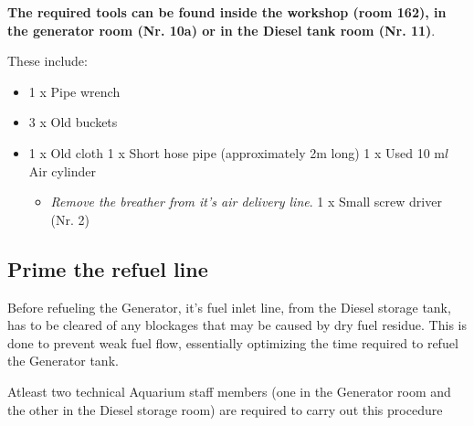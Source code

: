 \documentclass[
  12pt,
]{report}
\providecommand{\tightlist}{%
  \setlength{\itemsep}{0pt}\setlength{\parskip}{0pt}}\usepackage{longtable,booktabs,array}
\begin{document}
\textbf{The required tools can be found inside the workshop (room 162),
in the generator room (Nr. 10a) or in the Diesel tank room (Nr. 11)}.

These include:

\begin{itemize}
\tightlist
\item
  1 x Pipe wrench
\item
  3 x Old buckets
\item
  1 x Old cloth 1 x Short hose pipe (approximately 2m long) 1 x Used 10
  m\(l\) Air cylinder

  \begin{itemize}
  \tightlist
  \item
    \emph{Remove the breather from it's air delivery line}. 1 x Small
    screw driver (Nr. 2)
  \end{itemize}
\end{itemize}

\hypertarget{prime-the-refuel-line}{%
\subsection{Prime the refuel line}\label{prime-the-refuel-line}}

Before refueling the Generator, it's fuel inlet line, from the Diesel
storage tank, has to be cleared of any blockages that may be caused by
dry fuel residue. This is done to prevent weak fuel flow, essentially
optimizing the time required to refuel the Generator tank.

{Atleast two technical Aquarium staff members (one in the Generator room
and the other in the Diesel storage room) are required to carry out this
procedure}
\end{document}
